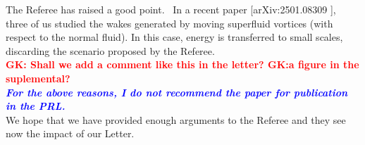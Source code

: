 \documentclass[a4paper,10pt]{article}
\def\red#1{\textcolor{red}{#1}}
\def\blue#1{\textcolor{blue}{#1}}
\def\refcomment#1{\textbf{\blue{\emph{#1}}}\\}
\begin{document}
The Referee has raised a good point.  In a recent paper [arXiv:2501.08309 ], three of us studied the wakes generated by moving superfluid vortices (with respect to the normal fluid). In this case, energy is transferred to small scales, discarding the scenario proposed by the Referee.\\

\red{\textbf{GK: Shall we add a comment like this in the letter? GK:a figure in the suplemental? }}\\

\refcomment{For the above reasons, I do not recommend the paper for publication in the PRL.}

We hope that we have provided enough arguments to the Referee and they see now the impact of our Letter.
\end{document}

